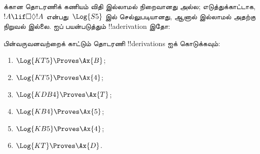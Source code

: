 \documentclass[../../../include/open-logic-section]{subfiles}
\begin{document}
\begin{ex}
 க்கான தொடரணிக் கணியம் \Cut{} விதி இல்லாமல் நிறைவானது அல்ல;
எடுத்துக்காட்டாக, %
{$!A \lif \Box\Diamond !A$} என்பது~$\Log{S5}$ இல் செல்லுபடியானது, ஆனால்
\Cut{} இல்லாமல் அதற்கு நிறுவல் இல்லை. \Cut{} ஐப் பயன்படுத்தும்
!!a{derivation} இதோ:
\begin{prooftree}
\end{prooftree}
\end{ex}

\begin{prob}
பின்வருவனவற்றைக் காட்டும் தொடரணி !!{derivation}s ஐக் கொடுக்கவும்:
  \begin{enumerate}
  \item $\Log{KT5} \Proves \Ax{B}$;
  \item $\Log{KT5} \Proves \Ax{4}$;
  \item $\Log{KDB4} \Proves \Ax{T}$;
  \item $\Log{KB4} \Proves \Ax{5}$;
  \item $\Log{KB5} \Proves \Ax{4}$;
  \item $\Log{KT} \Proves \Ax{D}$.
  \end{enumerate}
\end{prob}
\end{document}
